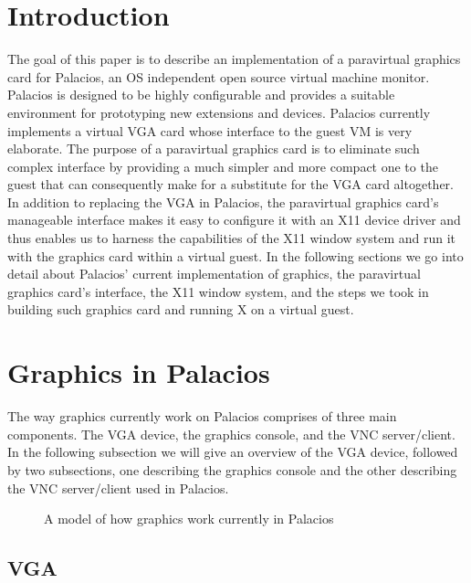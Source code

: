 \documentclass{acm_proc_article-sp}
\begin{document}
\section{Introduction}
The goal of this paper is to describe an implementation of a paravirtual
graphics card for Palacios, an OS independent open source virtual machine
monitor. \cite{techreport} Palacios is designed to be 
highly configurable and provides a suitable environment
for prototyping new extensions and devices. \cite{techreport} Palacios currently implements
  a virtual VGA card whose interface to the guest VM is very elaborate. The
  purpose of a paravirtual graphics card is to eliminate such complex interface
  by providing a much simpler and more compact one to the guest that can
  consequently make for a substitute for the VGA card altogether. In addition to
  replacing the VGA in Palacios, the paravirtual graphics card's manageable
  interface makes it easy to configure it with an X11 device driver and thus
  enables us to harness the capabilities of the X11 window system and run it with the
  graphics card within a virtual guest. In the following sections we go into
  detail about Palacios' current implementation of graphics, the paravirtual
  graphics card's interface, the X11 window system, and the steps we took in
  building such graphics card and running X on a virtual guest.

\section{Graphics in Palacios}
The way graphics currently work on Palacios comprises of three main components.
The VGA device, the graphics console, and the VNC server/client. In the
following subsection we will give an overview of the VGA device, followed by two
subsections, one describing the graphics console and the other describing the
VNC server/client used in Palacios.

\begin{figure}[h]                                              
\centering                                                 
{}                                      
\caption{A model of how graphics work currently in Palacios}   
\end{figure}                                               

\subsection{VGA}
\end{document}
